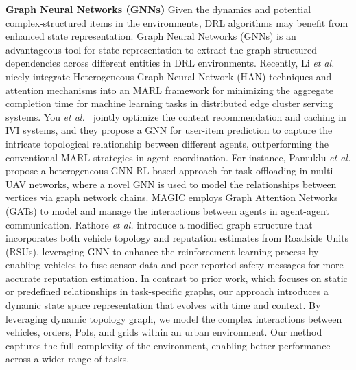 \smallskip
\noindent\textbf{Graph Neural Networks (GNNs)}
Given the dynamics and potential complex-structured items in the environments, DRL algorithms may benefit from enhanced state representation. Graph Neural Networks (GNNs) is an advantageous tool for state representation to extract the graph-structured dependencies across different entities in DRL environments. Recently, Li \emph{et al.}~\cite{liyihong} nicely integrate Heterogeneous Graph Neural Network (HAN) techniques and attention mechanisms into an MARL framework for minimizing the aggregate completion time for machine learning tasks in distributed edge cluster serving systems. You \emph{et al.}~\cite{you2024raccoon} jointly optimize the content recommendation and caching in IVI systems, and they propose a GNN for user-item prediction to capture the intricate topological relationship between different agents, outperforming the conventional MARL strategies in agent coordination. 
For instance, Pamuklu \emph{et al.}\cite{pamuklu2023heterogeneous} propose a heterogeneous GNN-RL-based approach for task offloading in multi-UAV networks, where a novel GNN is used to model the relationships between vertices via graph network chains. MAGIC\cite{niu2021multi} employs Graph Attention Networks (GATs) to model and manage the interactions between agents in agent-agent communication. Rathore \emph{et al.}\cite{rathore2023gnn} introduce a modified graph structure that incorporates both vehicle topology and reputation estimates from Roadside Units (RSUs), leveraging GNN to enhance the reinforcement learning process by enabling vehicles to fuse sensor data and peer-reported safety messages for more accurate reputation estimation.  In contrast to prior work, which focuses on static or predefined relationships in task-specific graphs, our approach introduces a dynamic state space representation that evolves with time and context. By leveraging dynamic topology graph, we model the complex interactions between vehicles, orders, PoIs, and grids within an urban environment. Our method captures the full complexity of the environment, enabling better performance across a wider range of tasks.
